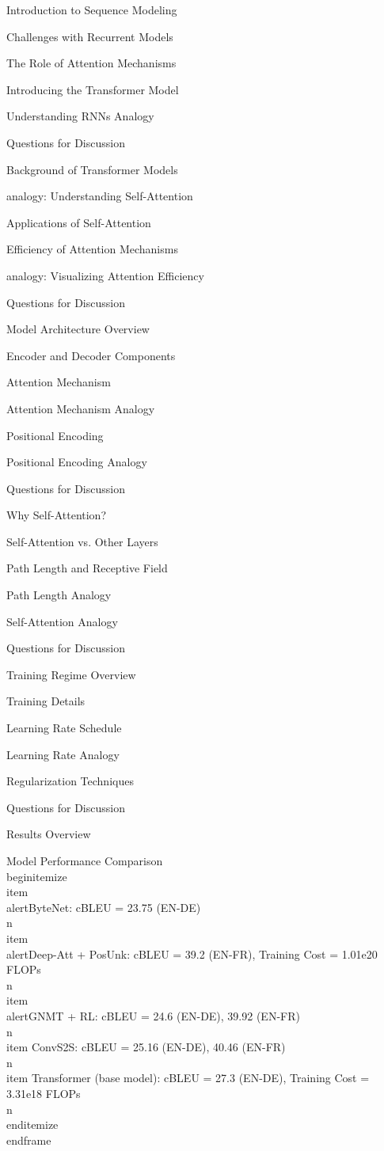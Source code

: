 \documentclass{beamer}
\begin{document}
\begin{frame}[]{Introduction to Sequence Modeling}
\begin{frame}[]{Challenges with Recurrent Models}
\begin{frame}[]{The Role of Attention Mechanisms}
\begin{frame}[]{Introducing the Transformer Model}
\begin{frame}[plain]{Understanding RNNs Analogy}
\begin{frame}[]{Questions for Discussion}
\begin{frame}[]{Background of Transformer Models}
\begin{frame}[plain]{analogy: Understanding Self-Attention}
\begin{frame}[]{Applications of Self-Attention}
\begin{frame}[]{Efficiency of Attention Mechanisms}
\begin{frame}[plain]{analogy: Visualizing Attention Efficiency}
\begin{frame}[]{Questions for Discussion}
\begin{frame}[]{Model Architecture Overview}
\begin{frame}[]{Encoder and Decoder Components}
\begin{frame}[]{Attention Mechanism}
\begin{frame}[plain]{Attention Mechanism Analogy}
\begin{frame}[]{Positional Encoding}
\begin{frame}[plain]{Positional Encoding Analogy}
\begin{frame}[]{Questions for Discussion}
\begin{frame}[]{Why Self-Attention?}
\begin{frame}[]{Self-Attention vs. Other Layers}
\begin{frame}[]{Path Length and Receptive Field}
\begin{frame}[plain]{Path Length Analogy}
\begin{frame}[plain]{Self-Attention Analogy}
\begin{frame}[]{Questions for Discussion}
\begin{frame}[]{Training Regime Overview}
\begin{frame}[]{Training Details}
\begin{frame}[]{Learning Rate Schedule}
\begin{frame}[plain]{Learning Rate Analogy}
\begin{frame}[]{Regularization Techniques}
\begin{frame}[]{Questions for Discussion}
\begin{frame}[]{Results Overview}
\begingroup
{}\n{}\n\begin{frame}[]{Model Performance Comparison}\n\\begin{itemize}
\\item \\alert{ByteNet: cBLEU = 23.75 (EN-DE)}\\n\\item \\alert{Deep-Att + PosUnk: cBLEU = 39.2 (EN-FR), Training Cost = 1.01e20 FLOPs}\\n\\item \\alert{GNMT + RL: cBLEU = 24.6 (EN-DE), 39.92 (EN-FR)}\\n\\item ConvS2S: cBLEU = 25.16 (EN-DE), 40.46 (EN-FR)\\n\\item Transformer (base model): cBLEU = 27.3 (EN-DE), Training Cost = 3.31e18 FLOPs\\n\\end{itemize}
\\end{frame}

\endgroup


\end{frame}
\end{frame}
\end{frame}
\end{frame}
\end{frame}
\end{frame}
\end{frame}
\end{frame}
\end{frame}
\end{frame}
\end{frame}
\end{frame}
\end{frame}
\end{frame}
\end{frame}
\end{frame}
\end{frame}
\end{frame}
\end{frame}
\end{frame}
\end{frame}
\end{frame}
\end{frame}
\end{frame}
\end{frame}
\end{frame}
\end{frame}
\end{frame}
\end{frame}
\end{frame}
\end{frame}
\end{frame}
\end{frame}
\end{document}
